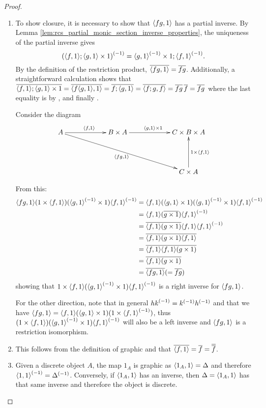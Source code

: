 \begin{proof}
  \prepprooflist
  \begin{enumerate}[{(}i{)}]
    \item To show closure, it is necessary to show that $\langle f g,1\rangle$ has a partial inverse.
      By Lemma \vref{lem:rcs_partial_monic_section_inverse_properties}, the uniqueness of the
      partial inverse gives
      \[
        {(\langle f,1\rangle ; \langle g,1\rangle\times 1)}^{(-1)} = {\langle g,1\rangle}^{(-1)} \times 1 ; {\langle f,1\rangle}^{(-1)} .
      \]
      By the definition of the restriction product, $\overline{\langle f g,1\rangle} = \overline{f g}$. Additionally,
      a straightforward calculation shows that
        $\overline{\langle f,1\rangle;\langle g,1\rangle \times 1} =
          \overline{\langle f\langle g,1\rangle, 1\rangle} = \overline{f ;\langle g,1\rangle}
          = \overline{\langle f;g, f\rangle} = \overline{f g}\,\overline{f} = \overline{f g}
        $
      where the last equality is by \rtwo, \rthree and finally \rone.

    Consider the diagram
    \[
      \xymatrix @C+35pt @R+20pt{
        A \ar[r]^{\<f,1\>} \ar[drr]_{\<f g,1\>} &
           B \times A  \ar[r]^{\<g,1\> \times 1}
           &  C \times B \times A \\
        &&C \times A \ar[u]_{1 \times \<f,1\>}
      }
    \]

    From this:
    \begin{align*}
      \langle f g,1\rangle  (1\times \langle f,1\rangle) ( {\langle g,1\rangle}^{(-1)}\times 1) {\langle f,1\rangle}^{(-1)}
      &=\langle f,1\rangle(\langle g,1\rangle\times 1 ) ({\langle g,1\rangle}^{(-1)}\times 1) {\langle f,1\rangle}^{(-1)}\\
      &=\langle f,1\rangle (\overline{g\times 1}) {\langle f,1\rangle}^{(-1)}\\
      &=\overline{\langle f,1\rangle (g\times 1)}  \langle f,1\rangle {\langle f,1\rangle}^{(-1)}\\
      &=\overline{\langle f,1\rangle (g\times 1)}  \overline{\langle f,1\rangle}\\
      &= \overline{\langle f,1\rangle} \overline{\langle f,1\rangle(g\times 1)}\\
      &= \overline{\langle f,1\rangle (g\times 1)}\\
      &= \overline{\langle f g,1\rangle}(=\overline{f g})\\
    \end{align*}
    showing that $1\times \langle f,1\rangle  ({\langle g,1\rangle}^{(-1)}\times 1 ) {\langle f,1\rangle}^{(-1)}$ is
    a right inverse for $\langle f g,1\rangle$.

    For the other direction, note that in general ${h k}^{(-1)} = {k}^{(-1)}{h}^{(-1)}$ and that
    we have $\langle f g,1\rangle = \langle f,1\rangle (\langle g,1\rangle\times 1)  (1 \times {\langle f,1\rangle}^{(-1)})$, thus
    $(1\times \langle f,1\rangle)  ({\langle g,1\rangle}^{(-1)}\times 1) {\langle f,1\rangle}^{(-1)}$ will also be a left inverse and
    $\langle f g,1\rangle$ is a restriction isomorphism.

    \item This follows from the definition of graphic and that
       $\overline{\langle f,1\rangle} = \overline{f} = \overline{\overline{f}}$.

    \item Given a discrete object $A$, the map $1_A$ is graphic as $\langle1_A,1\rangle = \Delta$
      and therefore ${\langle1,1\rangle}^{(-1)} = {\Delta}^{(-1)}$. Conversely, if $\langle1_A,1\rangle$ has an inverse,
      then $\Delta = \langle1_A,1\rangle$ has that same inverse and therefore the object is discrete.
  \end{enumerate}
\end{proof}

